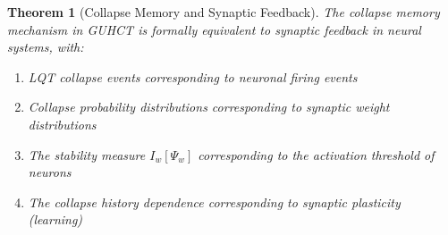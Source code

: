 \documentclass[11pt,a4paper]{article}
\newtheorem{theorem}{Theorem}[section]
\begin{document}
\begin{theorem}[Collapse Memory and Synaptic Feedback]
\label{thm:collapse_synaptic}
The collapse memory mechanism in GUHCT is formally equivalent to synaptic feedback in neural systems, with:
\begin{enumerate}
    \item LQT collapse events corresponding to neuronal firing events
    \item Collapse probability distributions corresponding to synaptic weight distributions
    \item The stability measure $I_w[\Psi_w]$ corresponding to the activation threshold of neurons
    \item The collapse history dependence corresponding to synaptic plasticity (learning)
\end{enumerate}
\end{theorem}
\end{document}
